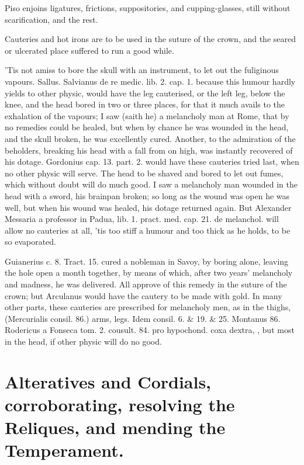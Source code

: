 Piso enjoins ligatures, frictions, suppositories, and
cupping-glasses, still without scarification, and the rest.

Cauteries and hot irons are to be used in the suture of the
crown, and the seared or ulcerated place suffered to run a good while.

'Tis not amiss to bore the skull with an instrument, to let out the
fuliginous vapours. Sallus. Salvianus de re medic. lib. 2. cap. 1.
because this humour hardly yields to other physic, would have the
leg cauterised, or the left leg, below the knee, and the head
bored in two or three places, for that it much avails to the exhalation
of the vapours;  I saw (saith he) a melancholy man at Rome, that
by no remedies could be healed, but when by chance he was wounded in
the head, and the skull broken, he was excellently cured. Another, to
the admiration of the beholders, breaking his head with a fall
from on high, was instantly recovered of his dotage. Gordonius cap. 13.
part. 2. would have these cauteries tried last, when no other physic
will serve.  The head to be shaved and bored to let out fumes,
which without doubt will do much good. I saw a melancholy man wounded
in the head with a sword, his brainpan broken; so long as the wound was
open he was well, but when his wound was healed, his dotage returned
again. But Alexander Messaria a professor in Padua, lib. 1. pract. med.
cap. 21. de melanchol. will allow no cauteries at all, 'tis too stiff a
humour and too thick as he holds, to be so evaporated.

Guianerius c. 8. Tract. 15. cured a nobleman in Savoy, by boring alone,
leaving the hole open a month together, by means of which, after
two years' melancholy and madness, he was delivered. All approve of
this remedy in the suture of the crown; but Arculanus would have the
cautery to be made with gold. In many other parts, these cauteries are
prescribed for melancholy men, as in the thighs, (Mercurialis consil.
86.) arms, legs. Idem consil. 6. \& 19. \& 25. Montanus 86. Rodericus a
Fonseca tom. 2. cousult. 84. pro hypochond. coxa dextra, \etc{}, but most
in the head, if other physic will do no good.

\section[Alternatives and Cordials]{Alteratives and Cordials, corroborating, resolving the Reliques, and mending the Temperament.}

